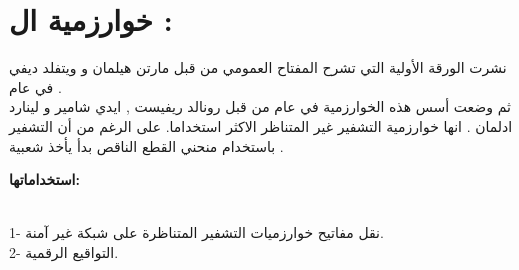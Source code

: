 \documentclass[11pt,a4paper]{report}
\begin{document}
\begin{otherlanguage}{arabic}
\begin{otherlanguage}{arabic}
\begin{center}
\end{center}
\end{otherlanguage}
















\chapter{خوارزمية ال  :}
\begin{otherlanguage}{arabic}
\begin{center}
نشرت الورقة الأولية التي تشرح المفتاح العمومي من قبل مارتن هيلمان و ويتفلد ديفي في عام  .
\\
ثم وضعت  أسس هذه الخوارزمية في عام  من قبل رونالد ريفيست , ايدي شامير و لينارد ادلمان .
\newline
انها خوارزمية التشفير غير المتناظر الاكثر استخداما.
\newline
على الرغم من أن التشفير باستخدام  منحني القطع الناقص  بدأ يأخذ شعبية  .
\\
\begin{flushleft}
\textbf{استخداماتها:}
\end{flushleft}
\\
1- نقل مفاتيح خوارزميات التشفير المتناظرة   على شبكة غير آمنة. 
\\
2- التواقيع الرقمية.
\end{center}
\end{otherlanguage}

\end{otherlanguage}
\end{document}
